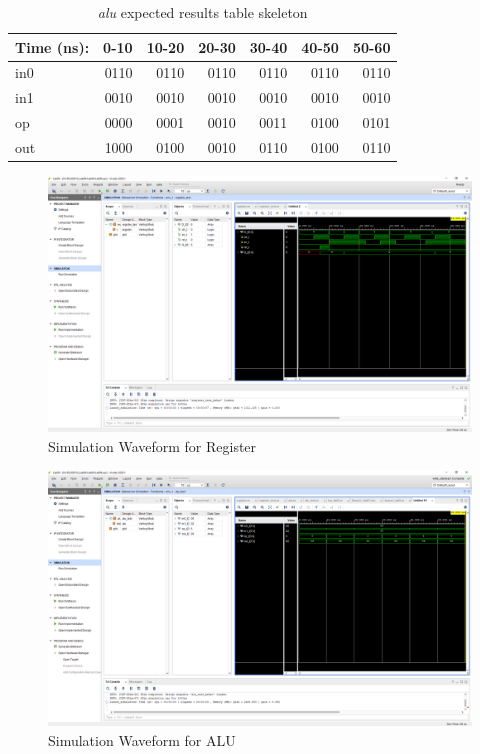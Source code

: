 \documentclass[11pt]{article}
\begin{document}
\begin{table}[ht]\centering
	\caption{\textit{alu} expected results table skeleton}
	\label{ALU:tbl:alu_ERT}\medskip
	\begin{tabular}{l|rrrrrr}
		Time (ns): & 0-10 & 10-20 & 20-30 & 30-40 & 40-50 & 50-60 \\
		\midrule
		in0 & 0110 & 0110 & 0110 & 0110 & 0110 & 0110 \\
		in1 & 0010 & 0010 & 0010 & 0010 & 0010 & 0010 \\
		op	& 0000 & 0001 & 0010 & 0011 & 0100 & 0101 \\
		\midrule
		out & 1000 & 0100 & 0010 & 0110 & 0100 & 0110 \\
		\bottomrule
	\end{tabular}
\end{table}

\begin{figure}[ht]\centering
	\caption{Simulation Waveform for Register}
	\includegraphics [width=1\textwidth,trim=640 550 10 135, clip]{register_sim}
\end{figure}

\begin{figure}[ht]\centering
	\caption{Simulation Waveform for ALU}
	\includegraphics [width=1\textwidth,trim=640 550 10 135, clip]{alu_sim}
\end{figure}
\end{document}
